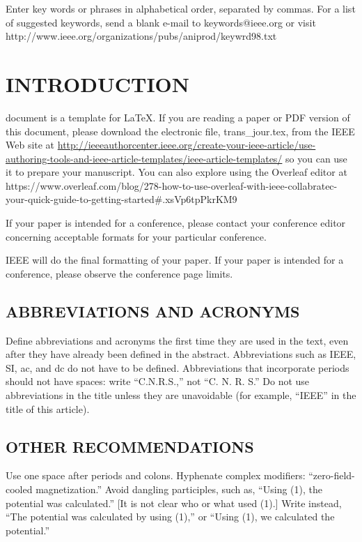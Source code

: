 \documentclass{IEEEoj}
\begin{document}
\begin{IEEEkeywords}
Enter key words or phrases in alphabetical order, separated by commas. For a list of suggested keywords, send a blank e-mail to keywords@ieee.org or visit 
http://www.ieee.org/\discretionary{}{}{}organizations/pubs/ani\textunderscore prod/keywrd98.txt
\end{IEEEkeywords}


\maketitle

\section{INTRODUCTION}
 document is a template for \LaTeX. If you are 
reading a paper or PDF version of this document, please download the 
electronic file, trans\_jour.tex, from the IEEE Web site at \underline
{http://ieeeauthorcenter.ieee.org/create-your-ieee-article/}\break\underline{use-authoring-tools-and-ieee-article-templates/ieee-article-}\break\underline{templates/} so you can use it to prepare your manuscript.
You can also explore using the Overleaf editor at 
{https://www.overleaf.com/blog/278-how-to-use-overleaf-with-ieee-collabratec-your-quick-guide-to-getting-started\break\#.xsVp6tpPkrKM9}

If your paper is intended for a conference, please contact your conference 
editor concerning acceptable formats for your particular 
conference.

IEEE will do the final formatting of your paper. If your paper is intended 
for a conference, please observe the conference page limits.

\subsection{ABBREVIATIONS AND ACRONYMS}
Define abbreviations and acronyms the first time they are used in the text, 
even after they have already been defined in the abstract. Abbreviations 
such as IEEE, SI, ac, and dc do not have to be defined. Abbreviations that 
incorporate periods should not have spaces: write ``C.N.R.S.,'' not ``C. N. 
R. S.'' Do not use abbreviations in the title unless they are unavoidable 
(for example, ``IEEE'' in the title of this article).

\subsection{OTHER RECOMMENDATIONS}
Use one space after periods and colons. Hyphenate complex modifiers: 
``zero-field-cooled magnetization.'' Avoid dangling participles, such as, 
``Using (1), the potential was calculated.'' [It is not clear who or what 
used (1).] Write instead, ``The potential was calculated by using (1),'' or 
``Using (1), we calculated the potential.''
\end{document}
